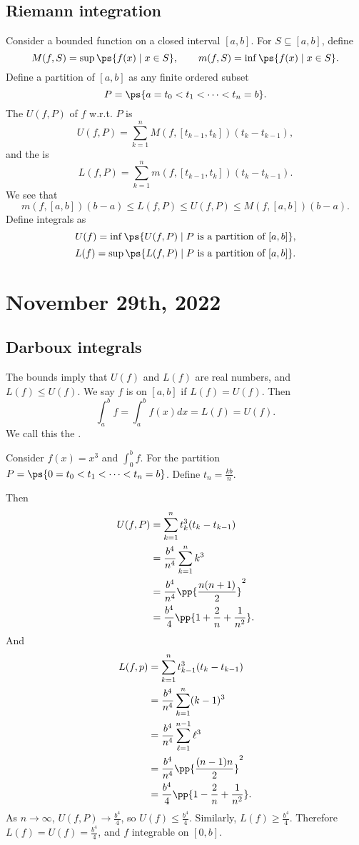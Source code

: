 \documentclass[11pt]{scrartcl}
\numberwithin{equation}{section}
\begin{document}
\subsection{Riemann integration}
Consider a bounded function on a closed interval $[a,b]$. For 
$S \subseteq [a,b]$, define 
\[
    M(f,S) = \sup\ps{f(x)\mid x\in S}, \qquad m(f,S) = 
    \inf\ps{f(x)\mid x\in S}.
\]
Define a partition of $[a,b]$ as any finite ordered subset 
\[
    P = \ps{a=t_0<t_1<\cdots<t_n=b}.
\]
The  $U(f,P)$ of $f$ w.r.t. $P$ is 
\[
    U(f,P) = \sum_{k=1}^{n}M(f,[t_{k-1},t_k])(t_k-t_{k-1}),
\]
and the  is 
\[
    L(f,P) = \sum_{k=1}^{n}m(f,[t_{k-1},t_k])(t_k-t_{k-1}).
\]
We see that 
\[
    m(f,[a,b])(b-a) \leq L(f,P) \leq U(f,P) \leq M(f,[a,b])(b-a).
\]
Define integrals as 
\[
    U(f) = \inf\ps{U(f,P)\mid P \text{ is a partition of }[a,b]},
\]
\[
    L(f) = \sup\ps{L(f,P)\mid P \text{ is a partition of }[a,b]}.
\]
\clearpage
\section{November 29th, 2022}

\subsection{Darboux integrals}

The bounds imply that $U(f)$ and $L(f)$ are real numbers, and 
$L(f)\leq U(f)$. We say $f$ is  on $[a,b]$ if 
$L(f)=U(f)$.
Then 
\[
    \int_a^b f = \int_a^b f(x)dx = L(f) = U(f).
\]
We call this the .

\begin{example}
    Consider $f(x)=x^3$ and $\int_0^bf$. For the partition 
    $P=\ps{0=t_0<t_1<\cdots<t_n=b}$. Define $t_n = \frac{kb}{n}$.

    Then 
    \begin{align*}
        U(f,P) &= \sum_{k=1}^{n}t_k^3(t_k-t_{k-1})\\ 
        &= \frac{b^4}{n^4}\sum_{k=1}^{n}k^3\\ 
        &= \frac{b^4}{n^4}\pp{\frac{n(n+1)}{2}}^2 \\
        &= \frac{b^4}{4}\pp{1+\frac{2}{n}+\frac{1}{n^2}}.
    \end{align*}
    And 
    \begin{align*}
        L(f,p) &= \sum_{k=1}^{n}t_{k-1}^3(t_k-t_{k-1}) \\
        &= \frac{b^4}{n^4}\sum_{k=1}^{n}(k-1)^3 \\
        &= \frac{b^4}{n^4}\sum_{\ell=1}^{n-1}\ell^3 \\
        &= \frac{b^4}{n^4}\pp{\frac{(n-1)n}{2}}^2 \\
        &= \frac{b^4}{4}\pp{1-\frac{2}{n}+\frac{1}{n^2}}.
    \end{align*}
    As $n\to\infty$, $U(f,P)\to \frac{b^4}{4}$, so $U(f)\leq\frac{b^4}{4}$. 
    Similarly, $L(f)\geq \frac{b^4}{4}$. Therefore $L(f)=U(f) = \frac{b^4}{4}$, and $f$ integrable on $[0,b]$. 
\end{example}
\end{document}
